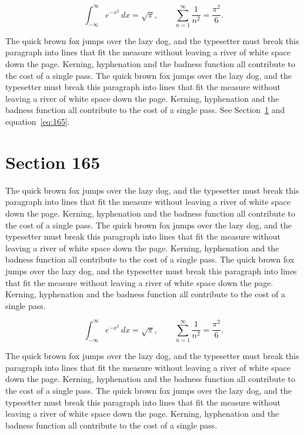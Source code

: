 \documentclass{article}
\begin{document}
\begin{equation}\label{eq:164}
\int_{-\infty}^{\infty} e^{-x^{2}}\,dx = \sqrt{\pi}, \qquad
\sum_{n=1}^{\infty} \frac{1}{n^{2}} = \frac{\pi^{2}}{6}.
\end{equation}

The quick brown fox jumps over the lazy dog, and the typesetter must break this paragraph into lines that fit the measure without leaving a river of white space down the page. Kerning, hyphenation and the badness function all contribute to the cost of a single pass. The quick brown fox jumps over the lazy dog, and the typesetter must break this paragraph into lines that fit the measure without leaving a river of white space down the page. Kerning, hyphenation and the badness function all contribute to the cost of a single pass. 
See Section~\ref{sec:165} and equation~\eqref{eq:165}.
\section{Section 165}
\label{sec:165}
The quick brown fox jumps over the lazy dog, and the typesetter must break this paragraph into lines that fit the measure without leaving a river of white space down the page. Kerning, hyphenation and the badness function all contribute to the cost of a single pass. The quick brown fox jumps over the lazy dog, and the typesetter must break this paragraph into lines that fit the measure without leaving a river of white space down the page. Kerning, hyphenation and the badness function all contribute to the cost of a single pass. The quick brown fox jumps over the lazy dog, and the typesetter must break this paragraph into lines that fit the measure without leaving a river of white space down the page. Kerning, hyphenation and the badness function all contribute to the cost of a single pass. 

\begin{equation}\label{eq:165}
\int_{-\infty}^{\infty} e^{-x^{2}}\,dx = \sqrt{\pi}, \qquad
\sum_{n=1}^{\infty} \frac{1}{n^{2}} = \frac{\pi^{2}}{6}.
\end{equation}

The quick brown fox jumps over the lazy dog, and the typesetter must break this paragraph into lines that fit the measure without leaving a river of white space down the page. Kerning, hyphenation and the badness function all contribute to the cost of a single pass. The quick brown fox jumps over the lazy dog, and the typesetter must break this paragraph into lines that fit the measure without leaving a river of white space down the page. Kerning, hyphenation and the badness function all contribute to the cost of a single pass. 
\end{document}
